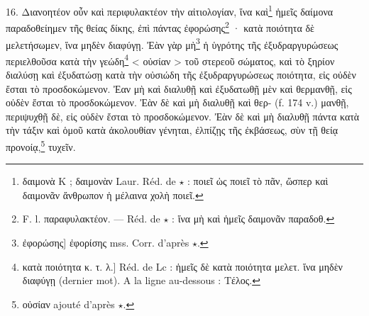 \documentclass[a4paper, 11pt, oneside, polutonikogreek, french]{article}
\begin{document}
16. Διανοητέον οὖν καὶ περιφυλακτέον τὴν αἰτιολογίαν, ἵνα καὶ\footnote{δαιμονὰ K ; δαιμονὰν Laur. Réd. de $\star$ : ποιεῖ ὡς ποιεῖ τὸ πᾶν, ὥσπερ καὶ δαιμονᾶν ἄνθρωπον ἡ μέλαινα χολὴ ποιεῖ.} ἡμεῖς δαίμονα παραδοθείημεν τῆς θείας δίκης, ἐπὶ πάντας ἐφορώσης\footnote{F. l. παραφυλακτέον. --- Réd. de $\star$ : ἵνα μὴ καὶ ἡμεῖς δαιμονᾶν παραδοθ.} · κατὰ ποιότητα δὲ μελετήσωμεν, ἵνα μηδὲν διαφύγῃ. Ἐὰν γὰρ μὴ\footnote{ἐφορώσης] ἐφορίσης mss. Corr. d'après $\star$.} ἡ ὑγρότης τῆς ἐξυδραργυρώσεως περιελθοῦσα κατὰ τὴν γεώδη\footnote{κατὰ ποιότητα κ. τ. λ.] Réd. de Lc : ἡμεῖς δὲ κατὰ ποιότητα μελετ. ἵνα μηδὲν διαφύγῃ (dernier mot). A la ligne au-dessous : Tέλος.} < οὐσίαν > τοῦ στερεοῦ σώματος, καὶ τὸ ξηρίον διαλύσῃ καὶ ἐξυδατώσῃ κατὰ τὴν οὐσιώδη τῆς ἐξυδραργυρώσεως ποιότητα, εἰς οὐδὲν ἔσται τὸ προσδοκώμενον. Ἐαν μὴ καὶ διαλυθῇ καὶ ἐξυδατωθῇ μὲν καὶ θερμανθῇ, εἰς οὐδὲν ἔσται τὸ προσδοκώμενον. Ἐὰν δὲ καὶ μὴ διαλυθῇ καὶ θερ- (f. 174 v.) μανθῇ, περιψυχθῇ δὲ, εἰς οὐδὲν ἔσται τὸ προσδοκώμενον. Ἐὰν δὲ καὶ μὴ διαλυθῇ πάντα κατὰ τὴν τάξιν καὶ ὁμοῦ κατὰ ἀκολουθίαν γένηται, ἐλπίζῃς τῆς ἐκβάσεως, σὺν τῇ θείᾳ προνοίᾳ,\footnote{οὐσίαν ajouté d'après $\star$.} τυχεῖν.
\end{document}
